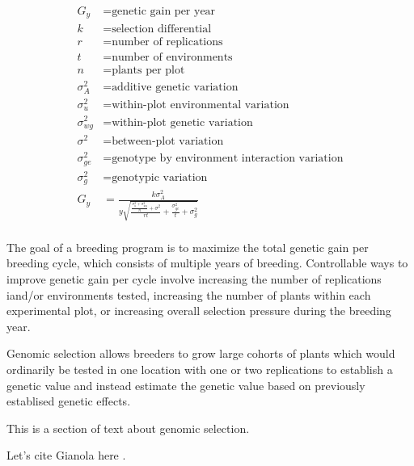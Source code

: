 \begin{equation} \label{eq:genetic_gain}
\begin{split}
    G_y           &= \textrm{genetic gain per year} \\
    k             &= \textrm{selection differential} \\
    r             &= \textrm{number of replications} \\
    t             &= \textrm{number of environments} \\
    n             &= \textrm{plants per plot} \\
    \sigma^2_{A}  &= \textrm{additive genetic variation} \\
    \sigma^2_{u}  &= \textrm{within-plot environmental variation} \\
    \sigma^2_{wg} &= \textrm{within-plot genetic variation} \\
    \sigma^2      &= \textrm{between-plot variation} \\
    \sigma^2_{ge} &= \textrm{genotype by environment interaction variation} \\
    \sigma^2_{g}  &= \textrm{genotypic variation} \\
    G_y           &= \frac{k\sigma^2_A}{y \sqrt{ \frac{\frac{\sigma^2_{u} + \sigma^2_{wg}}{n} + \sigma^2}{rt} + \frac{\sigma^2_{ge}}{t} + \sigma^2_{g} }} \\
\end{split}
\end{equation}

The goal of a breeding program is to maximize the total genetic gain per breeding cycle, 
which consists of multiple years of breeding. Controllable ways to improve genetic gain 
per cycle involve increasing the number of replications iand/or environments tested,
increasing the number of plants within each experimental plot, or increasing overall selection pressure
during the breeding year.

Genomic selection allows breeders to grow large cohorts of plants which would ordinarily be 
tested in one location with one or two replications to establish a genetic value and instead 
estimate the genetic value based on previously establised genetic effects. 


This is a section of text about genomic selection. 

Let's cite Gianola here \citep{gianola2006}.

\blindtext


\blindenumerate
\blindtext
